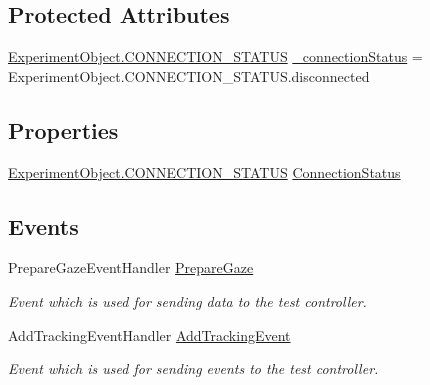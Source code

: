 \subsection*{Protected Attributes}
\begin{DoxyCompactItemize}
\item 
\hyperlink{class_web_analyzer_1_1_u_i_1_1_interaction_objects_1_1_experiment_object_a2875208b4f4b0ed643593152f4ec025c}{Experiment\+Object.\+C\+O\+N\+N\+E\+C\+T\+I\+O\+N\+\_\+\+S\+T\+A\+T\+U\+S} \hyperlink{class_web_analyzer_1_1_models_1_1_base_1_1_base_tracking_model_aecba61dd2b171d2f6dcf3abc40229d39}{\+\_\+connection\+Status} = Experiment\+Object.\+C\+O\+N\+N\+E\+C\+T\+I\+O\+N\+\_\+\+S\+T\+A\+T\+U\+S.\+disconnected
\end{DoxyCompactItemize}
\subsection*{Properties}
\begin{DoxyCompactItemize}
\item 
\hyperlink{class_web_analyzer_1_1_u_i_1_1_interaction_objects_1_1_experiment_object_a2875208b4f4b0ed643593152f4ec025c}{Experiment\+Object.\+C\+O\+N\+N\+E\+C\+T\+I\+O\+N\+\_\+\+S\+T\+A\+T\+U\+S} \hyperlink{class_web_analyzer_1_1_models_1_1_base_1_1_base_tracking_model_aea243d67939ea7e2e62adbdecc525026}{Connection\+Status}
\end{DoxyCompactItemize}
\subsection*{Events}
\begin{DoxyCompactItemize}
\item 
Prepare\+Gaze\+Event\+Handler \hyperlink{class_web_analyzer_1_1_models_1_1_base_1_1_base_tracking_model_acf17194aca2875e9f69c15772af39417}{Prepare\+Gaze}
\begin{DoxyCompactList}\small\item\em Event which is used for sending data to the test controller. \end{DoxyCompactList}\item 
Add\+Tracking\+Event\+Handler \hyperlink{class_web_analyzer_1_1_models_1_1_base_1_1_base_tracking_model_a3c003ad3cd3902810994f53409a6aeb7}{Add\+Tracking\+Event}
\begin{DoxyCompactList}\small\item\em Event which is used for sending events to the test controller. \end{DoxyCompactList}\end{DoxyCompactItemize}


